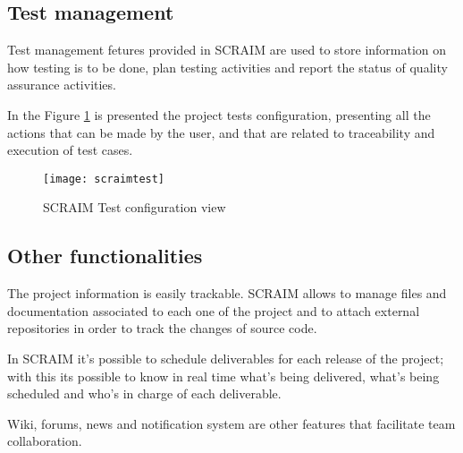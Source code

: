\subsection{Test management}
Test management fetures provided in SCRAIM are used to store information on how testing is to be done, plan testing activities and report the status of quality assurance activities.

In the Figure \ref{fig:scraimtest} is presented the project tests configuration, presenting all the actions that can be made by the user, and that are related to traceability and execution of test cases.

\begin{figure}[h]
	\begin{center}
		\leavevmode
		\texttt{[image: scraimtest]}
		\caption{SCRAIM Test configuration view}
		\label{fig:scraimtest}
	\end{center}
\end{figure}


\subsection{Other functionalities}
The project information is easily trackable. SCRAIM allows  to manage files and documentation associated to each one of the project and to attach external repositories in order to track the changes of source code.

In SCRAIM it's possible to schedule deliverables for each release of the project; with this its possible to know in real time what's being delivered, what's being scheduled and who's in charge of each deliverable.

Wiki, forums, news and notification system are other features that facilitate team collaboration.